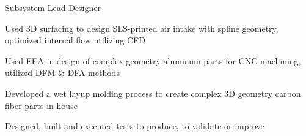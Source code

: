 \begin{cventries}
  \cventry
    {Subsystem Lead Designer} %
    {} %
    {} %
    {} %
    {
      \begin{cvitems} %
        \item{Used 3D surfacing to design SLS-printed air intake with spline geometry, optimized internal flow utilizing CFD}
        \item{Used FEA in design of complex geometry aluminum parts for CNC machining, utilized DFM \& DFA methods}
        \item{Developed a wet layup molding process to create complex 3D geometry carbon fiber parts in house}
        \item{Designed, built and executed tests to produce, to validate or improve}
      \end{cvitems}
    }
    
    

\end{cventries}


